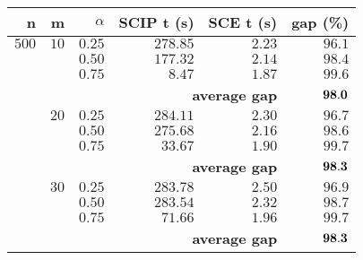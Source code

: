 \begin{tabular}[c]{|r|r|r|rrr|} \hline
\textbf{n}   & \textbf{m}  & \textbf{$\alpha$}    &\textbf{SCIP t (s)}& \textbf{SCE t (s)} & \textbf{gap (\%)} \\ \hline
$500$ & $10$ & $0.25$ & $278.85$ & $  2.23$  & $96.1$ \\
    &    & $0.50$ & $177.32$ & $  2.14$  & $98.4$ \\
    &    & $0.75$ & $  8.47$ & $  1.87$  & $99.6$ \\ \cline{2-6}
	   & \multicolumn{4}{r}{\textbf{average gap}}  & $\bf 98.0$  \\ \cline{2-6}
    & $20$ & $0.25$ & $284.11$ & $  2.30$  & $96.7$ \\
    &    & $0.50$ & $275.68$ & $  2.16$  & $98.6$ \\
    &    & $0.75$ & $ 33.67$ & $  1.90$  & $99.7$ \\ \cline{2-6}
	   & \multicolumn{4}{r}{\textbf{average gap}}  & $\bf 98.3$  \\ \cline{2-6}
    & $30$ & $0.25$ & $283.78$ & $  2.50$  & $96.9$ \\
    &    & $0.50$ & $283.54$ & $  2.32$  & $98.7$ \\
    &    & $0.75$ & $ 71.66$ & $  1.96$  & $99.7$ \\ \cline{2-6}
    & \multicolumn{4}{r}{\textbf{average gap}}  & $\bf 98.3$  \\ \hline
\end{tabular}
